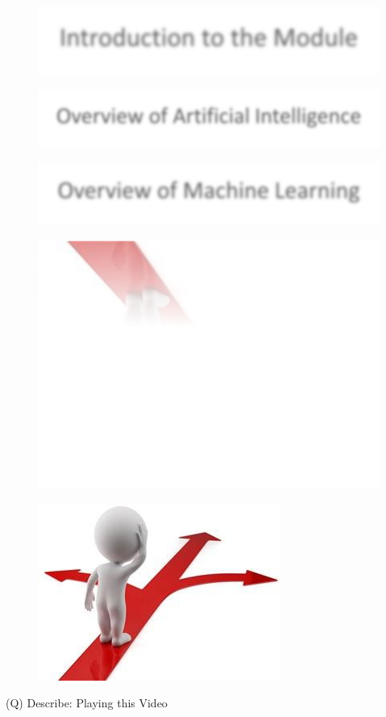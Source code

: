 \documentclass[12pt]{article}
\begin{document}
\begin{figure}[H]
\includegraphics[width=0.5\linewidth]{page2-image-6.png}
\end{figure}
\begin{figure}[H]
\includegraphics[width=0.5\linewidth]{page2-image-7.png}
\end{figure}
\begin{figure}[H]
\includegraphics[width=0.5\linewidth]{page2-image-8.png}
\end{figure}
\begin{figure}[H]
\includegraphics[width=0.5\linewidth]{page2-image-9.png}
\end{figure}
\begin{figure}[H]
\includegraphics[width=0.5\linewidth]{page2-image-10.png}
\end{figure}
\clearpage
(Q)
Describe: Playing this Video
\clearpage
\end{document}
